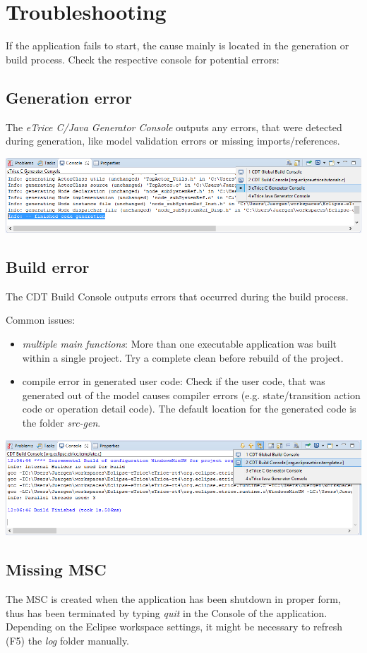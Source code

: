 \section{Troubleshooting}
If the application fails to start, the cause mainly is located in the generation or build process. Check the respective console for potential errors:

\subsection*{Generation error}
The \emph{eTrice C/Java Generator Console} outputs any errors, that were detected during generation, like model validation errors or missing imports/references.

\includegraphics[width=\textwidth]{images/020-gen-console.png}


\subsection*{Build error}
The CDT Build Console outputs errors that occurred during the build process.

Common issues:
\begin{itemize}
	\item \emph{multiple main functions}: More than one executable application was built within a single project. Try a complete clean before rebuild of the project.
	\item compile error in generated user code: Check if the user code, that was generated out of the model causes compiler errors (e.g. state/transition action code or operation detail code). The default location for the generated code is the folder \emph{src-gen}.
\end{itemize}

\includegraphics[width=\textwidth]{images/020-build-console.png}

\subsection*{Missing MSC}
The MSC is created when the application has been shutdown in proper form, thus has been terminated by typing \emph{quit} in the Console of the application. Depending on the Eclipse workspace settings, it might be necessary to refresh (F5) the \emph{log} folder manually.
